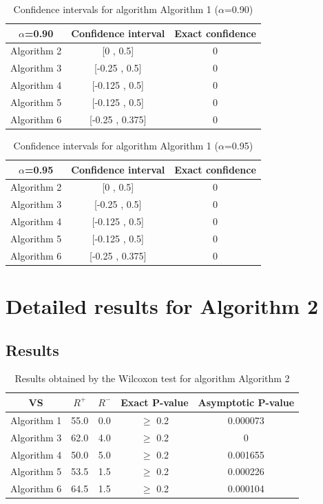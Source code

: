 \documentclass[a4paper,10pt]{article}
\begin{document}
\begin{table}[!htp]
\centering\small
\begin{tabular}{
|c|c|c|}
\hline
 $\alpha$=0.90 & Confidence interval & Exact confidence \\ \hline 
Algorithm 2 & [0 , 0.5] & 0\\ \hline 
Algorithm 3 & [-0.25 , 0.5] & 0\\ \hline 
Algorithm 4 & [-0.125 , 0.5] & 0\\ \hline 
Algorithm 5 & [-0.125 , 0.5] & 0\\ \hline 
Algorithm 6 & [-0.25 , 0.375] & 0\\ \hline 

\end{tabular}
\caption{Confidence intervals for algorithm Algorithm 1 ($\alpha$=0.90)}
\end{table}
\begin{table}[!htp]
\centering\small
\begin{tabular}{
|c|c|c|}
\hline
 $\alpha$=0.95 & Confidence interval & Exact confidence \\ \hline 
Algorithm 2 & [0 , 0.5] & 0\\ \hline 
Algorithm 3 & [-0.25 , 0.5] & 0\\ \hline 
Algorithm 4 & [-0.125 , 0.5] & 0\\ \hline 
Algorithm 5 & [-0.125 , 0.5] & 0\\ \hline 
Algorithm 6 & [-0.25 , 0.375] & 0\\ \hline 

\end{tabular}
\caption{Confidence intervals for algorithm Algorithm 1 ($\alpha$=0.95)}
\end{table}

 \clearpage 


\section{Detailed results for Algorithm 2}


\subsection{Results}

\begin{table}[!htp]
\centering\small
\begin{tabular}{
|c|c|c|c|c|}
\hline
 VS & $R^{+}$ & $R^{-}$ & Exact P-value & Asymptotic P-value \\ \hline 
Algorithm 1 & 55.0 & 0.0 & $\geq$ 0.2 & 0.000073\\ \hline 
Algorithm 3 & 62.0 & 4.0 & $\geq$ 0.2 & 0\\ \hline 
Algorithm 4 & 50.0 & 5.0 & $\geq$ 0.2 & 0.001655\\ \hline 
Algorithm 5 & 53.5 & 1.5 & $\geq$ 0.2 & 0.000226\\ \hline 
Algorithm 6 & 64.5 & 1.5 & $\geq$ 0.2 & 0.000104\\ \hline 

\end{tabular}
\caption{Results obtained by the Wilcoxon test for algorithm Algorithm 2}
\end{table}
\end{document}
